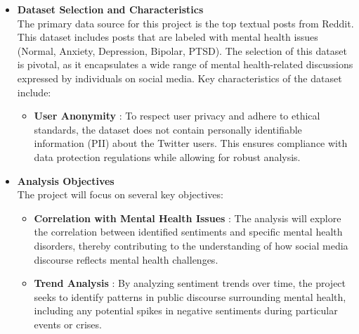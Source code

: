 \begin{itemize}
    \item \textbf{Dataset Selection and Characteristics} \\
    \noindent
    The primary data source for this project is the top textual posts from Reddit. This dataset includes posts that are labeled with mental health issues (Normal, Anxiety, Depression, Bipolar, PTSD). The selection of this dataset is pivotal, as it encapsulates a wide range of mental health-related discussions expressed by individuals on social media. Key characteristics of the dataset include:
    \begin{itemize}
        \item \textbf{User Anonymity} :
        \noindent
        To respect user privacy and adhere to ethical standards, the dataset does not contain personally identifiable information (PII) about the Twitter users. This ensures compliance with data protection regulations while allowing for robust analysis.
    \end{itemize}

    \item \textbf{Analysis Objectives} \\
    \noindent
    The project will focus on several key objectives:
    \begin{itemize}
        \item \textbf{Correlation with Mental Health Issues} :
        \noindent
        The analysis will explore the correlation between identified sentiments and specific mental health disorders, thereby contributing to the understanding of how social media discourse reflects mental health challenges.
        \item \textbf{Trend Analysis} :
        \noindent
        By analyzing sentiment trends over time, the project seeks to identify patterns in public discourse surrounding mental health, including any potential spikes in negative sentiments during particular events or crises.
    \end{itemize}


\end{itemize}
